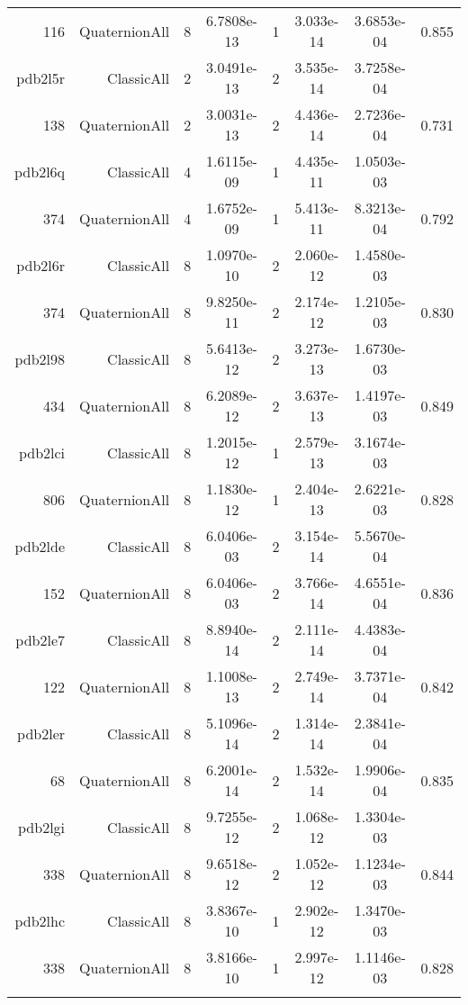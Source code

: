 \begin{xltabular}{\textwidth}{r|rcS[table-format=1.4e+2]cS[table-format=1.3e+2]S[table-format=1.4e+2]S[table-format=-1.3]}
116 & QuaternionAll & 8 & 6.7808e-13 & 1 & 3.033e-14 & 3.6853e-04 & 0.855\\  \addlinespace
pdb2l5r & ClassicAll & 2 & 3.0491e-13 & 2 & 3.535e-14 & 3.7258e-04 & \\
138 & QuaternionAll & 2 & 3.0031e-13 & 2 & 4.436e-14 & 2.7236e-04 & 0.731\\  \addlinespace
pdb2l6q & ClassicAll & 4 & 1.6115e-09 & 1 & 4.435e-11 & 1.0503e-03 & \\
374 & QuaternionAll & 4 & 1.6752e-09 & 1 & 5.413e-11 & 8.3213e-04 & 0.792\\  \addlinespace
pdb2l6r & ClassicAll & 8 & 1.0970e-10 & 2 & 2.060e-12 & 1.4580e-03 & \\
374 & QuaternionAll & 8 & 9.8250e-11 & 2 & 2.174e-12 & 1.2105e-03 & 0.830\\  \addlinespace
pdb2l98 & ClassicAll & 8 & 5.6413e-12 & 2 & 3.273e-13 & 1.6730e-03 & \\
434 & QuaternionAll & 8 & 6.2089e-12 & 2 & 3.637e-13 & 1.4197e-03 & 0.849\\  \addlinespace
pdb2lci & ClassicAll & 8 & 1.2015e-12 & 1 & 2.579e-13 & 3.1674e-03 & \\
806 & QuaternionAll & 8 & 1.1830e-12 & 1 & 2.404e-13 & 2.6221e-03 & 0.828\\  \addlinespace
pdb2lde & ClassicAll & 8 & 6.0406e-03 & 2 & 3.154e-14 & 5.5670e-04 & \\
152 & QuaternionAll & 8 & 6.0406e-03 & 2 & 3.766e-14 & 4.6551e-04 & 0.836\\  \addlinespace
pdb2le7 & ClassicAll & 8 & 8.8940e-14 & 2 & 2.111e-14 & 4.4383e-04 & \\
122 & QuaternionAll & 8 & 1.1008e-13 & 2 & 2.749e-14 & 3.7371e-04 & 0.842\\  \addlinespace
pdb2ler & ClassicAll & 8 & 5.1096e-14 & 2 & 1.314e-14 & 2.3841e-04 & \\
68 & QuaternionAll & 8 & 6.2001e-14 & 2 & 1.532e-14 & 1.9906e-04 & 0.835\\  \addlinespace
pdb2lgi & ClassicAll & 8 & 9.7255e-12 & 2 & 1.068e-12 & 1.3304e-03 & \\
338 & QuaternionAll & 8 & 9.6518e-12 & 2 & 1.052e-12 & 1.1234e-03 & 0.844\\  \addlinespace
pdb2lhc & ClassicAll & 8 & 3.8367e-10 & 1 & 2.902e-12 & 1.3470e-03 & \\
338 & QuaternionAll & 8 & 3.8166e-10 & 1 & 2.997e-12 & 1.1146e-03 & 0.828\\  \addlinespace

\end{xltabular}
